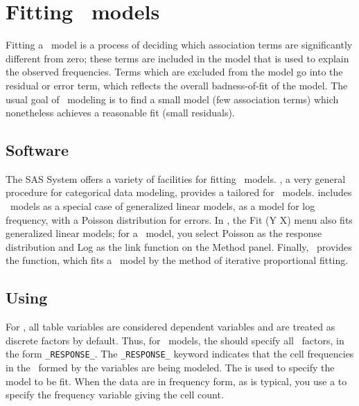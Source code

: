 \section{Fitting \loglin\ models} \label{sec:loglin-fitting}

Fitting a \loglin\ model is a process of
deciding which association terms are significantly different from zero;
these terms are included in the model that is used to explain the
observed frequencies.  Terms which are excluded from the model go
into the residual or error term, which reflects the overall
badness-of-fit of the model.  The usual goal of \loglin\ modeling
is to find a small model (few association terms) which nonetheless achieves a
reasonable fit (small residuals).



\subsection{Software}
The SAS System offers a variety of facilities for fitting \loglin\
models.  , a very
general procedure for categorical data modeling, provides a 
tailored for \loglin\ models.
 includes \loglin\ models as a special case of
generalized linear models, as a model for log frequency, with a
Poisson distribution for errors.
In \INSIGHT, the \textsf{Fit (Y X)} menu also
fits generalized linear models;  for a \loglin\ model,
you select Poisson as the response distribution and Log as the
link function on the \textsf{Method} panel.
Finally, \IML\ provides the  function,
which fits a \loglin\ model by the method of iterative proportional fitting.

\subsection{Using }
For \PROC{CATMOD}, all table variables are considered dependent
variables and are treated as discrete factors by default.
Thus,
for \loglin\ models, the 
should specify
all \ctab\ factors, in the form
\verb|_RESPONSE_|.
The
\verb|_RESPONSE_| keyword indicates that
the cell frequencies in the \ctab\ formed by the variables
 are being modeled.
The
 is used
to specify the model to be fit.  When the data are in
frequency form, as is typical, you use a  to specify the
frequency variable giving the cell count.

